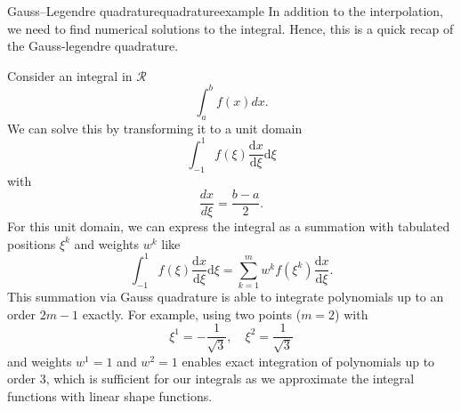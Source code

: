 \begin{example}{Gauss–Legendre quadrature}{quadratureexample} 
    In addition to the interpolation, we need to find numerical solutions to the integral. Hence, this is a quick recap of the Gauss-legendre quadrature. 
    
    Consider an integral in $\mathcal{R}$
    \begin{equation}
        \int_{a}^{b} f(x) dx.
    \end{equation}
    We can solve this by transforming it to a unit domain
    \begin{equation}
        \int_{-1}^{1} f(\xi) \frac{\text{d}x}{\text{d}\xi} \text{d}\xi
    \end{equation}
    with 
    \begin{equation}
        \frac{dx}{d\xi} = \frac{b-a}{2}.
    \end{equation}
    For this unit domain, we can express the integral as a summation with tabulated positions $\xi^k$ and weights $w^k$ like
    \begin{equation}
        \int_{-1}^{1} f(\xi) \frac{\text{d}x}{\text{d}\xi} \text{d}\xi
        = \sum_{k=1}^m w^k f(\xi^k) \frac{\text{d}x}{\text{d}\xi}.
    \end{equation}
    This summation via Gauss quadrature is able to integrate polynomials up to an order $2m-1$ exactly. For example, using two points ($m=2$) with 
    \begin{equation}
        \xi^1 = -\frac{1}{\sqrt{3}}, \quad \xi^2 = \frac{1}{\sqrt{3}}
    \end{equation}
    and weights $w^1=1$ and $w^2=1$ enables exact integration of polynomials up to order 3, which is sufficient for our integrals as we approximate the integral functions with linear shape functions. 

    \begin{center}
        
    \end{center}
    

\end{example}

